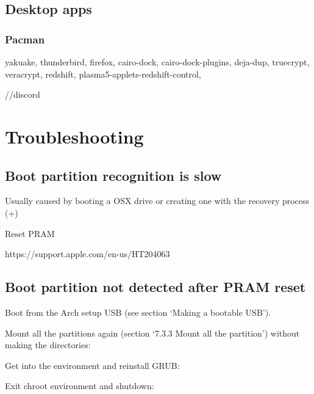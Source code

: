 \subsection{Desktop apps}


\subsubsection{Pacman}

yakuake, thunderbird, firefox, cairo-dock, cairo-dock-plugins, deja-dup, truecrypt, veracrypt, 
redshift, plasma5-applets-redshift-control, 



//discord

\section{Troubleshooting}

\subsection{Boot partition recognition is slow}

Usually caused by booting a OSX drive or creating one with the recovery process (+)

Reset PRAM

https://support.apple.com/en-us/HT204063

\subsection{Boot partition not detected after PRAM reset}

Boot from the Arch setup USB (see section `Making a bootable USB').

Mount all the partitions again (section `7.3.3 Mount all the partition') without making the directories:


Get into the  environment and reinstall GRUB:


Exit chroot environment and shutdown:

